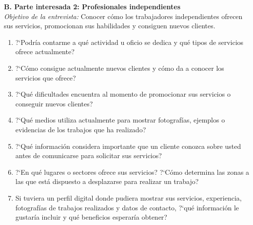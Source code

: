 \documentclass[11pt,a4paper]{article}
\begin{document}
\vspace{3pt}
\noindent\textbf{B. Parte interesada 2: Profesionales independientes}\\
\textit{Objetivo de la entrevista:} Conocer c\'omo los trabajadores independientes ofrecen sus servicios, promocionan sus habilidades y consiguen nuevos clientes.
\begin{enumerate}[label=\textbf{\arabic*.}, leftmargin=1.8em, itemsep=1pt, topsep=2pt, start=8]
    \item ?`Podr\'ia contarme a qu\'e actividad u oficio se dedica y qu\'e tipos de servicios ofrece actualmente?
    \item ?`C\'omo consigue actualmente nuevos clientes y c\'omo da a conocer los servicios que ofrece?
    \item ?`Qu\'e dificultades encuentra al momento de promocionar sus servicios o conseguir nuevos clientes?
    \item ?`Qu\'e medios utiliza actualmente para mostrar fotograf\'ias, ejemplos o evidencias de los trabajos que ha realizado?
    \item ?`Qu\'e informaci\'on considera importante que un cliente conozca sobre usted antes de comunicarse para solicitar sus servicios?
    \item ?`En qu\'e lugares o sectores ofrece sus servicios? ?`C\'omo determina las zonas a las que est\'a dispuesto a desplazarse para realizar un trabajo?
    \item Si tuviera un perfil digital donde pudiera mostrar sus servicios, experiencia, fotograf\'ias de trabajos realizados y datos de contacto, ?`qu\'e informaci\'on le gustar\'ia incluir y qu\'e beneficios esperar\'ia obtener?
\end{enumerate}
\end{document}
